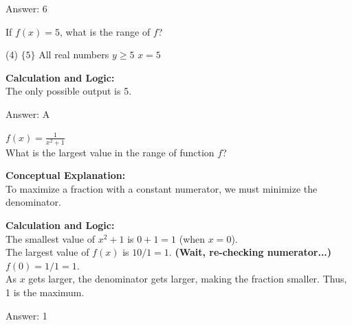 \documentclass[11pt,paper=a4,answers]{exam}
\begin{document}
\begin{questions}
\begin{solution}
\vspace{30pt}

Answer: \colorbox{yellow!100}{6}
\end{solution}

\vspace{40pt}

\question
If $f(x) = 5$, what is the range of $f$?
\begin{tasks}(4)
    \task $\{5\}$
    \task All real numbers
    \task $y \geq 5$
    \task $x = 5$
\end{tasks}

\begin{solution}
\textbf{Calculation and Logic:} \\
The only possible output is 5.

\vspace{30pt}

Answer: \colorbox{yellow!100}{A}
\end{solution}

\vspace{40pt}

\question
$f(x) = \frac{1}{x^2 + 1}$ \\
What is the largest value in the range of function $f$?

\begin{solution}
\textbf{Conceptual Explanation:} \\
To maximize a fraction with a constant numerator, we must minimize the denominator.

\vspace{30pt}

\textbf{Calculation and Logic:} \\
The smallest value of $x^2 + 1$ is $0 + 1 = 1$ (when $x=0$). \\
The largest value of $f(x)$ is $10 / 1 = 1$. \textbf{(Wait, re-checking numerator...)} \\
$f(0) = 1/1 = 1$. \\
As $x$ gets larger, the denominator gets larger, making the fraction smaller. Thus, 1 is the maximum.

\vspace{30pt}

Answer: \colorbox{yellow!100}{1}
\end{solution}

\vspace{40pt}


\end{questions}
\end{document}
